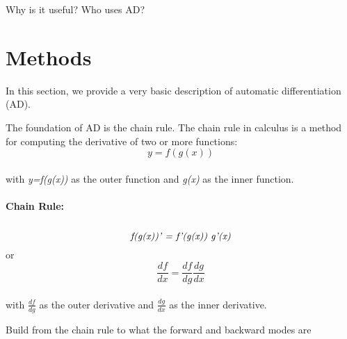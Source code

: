 \documentclass[oneside]{article}
\begin{document}
\begin{editnote}
Why is it useful?
Who uses AD?
\end{editnote}

\section{Methods}

In this section, we provide a very basic description of automatic differentiation (AD).

The foundation of AD is the chain rule. The chain rule in calculus is a method for computing the derivative of two or more functions:\\
 \begin{equation}
 y = f(g(x))
 \end{equation}
  \\
 with \textit{y=f(g(x))} as the outer function and \textit{g(x)} as the inner function. \\
 \\
 \textbf{Chain Rule:} \\ \\
  \begin{equation}
 \textit{f(g(x))' = f'(g(x)) g'(x)} \\
 \end{equation}
 or \\
\begin{equation}
\frac{df}{dx} = \frac{df}{dg}\frac{dg}{dx}
\end{equation}
\\
with \textit{$\frac{df}{dg}$} as the outer derivative and \textit{$\frac{dg}{dx}$} as the inner derivative. \\

\begin{editnote}
Build from the chain rule to what the forward and backward modes are
\end{editnote}
\end{document}

